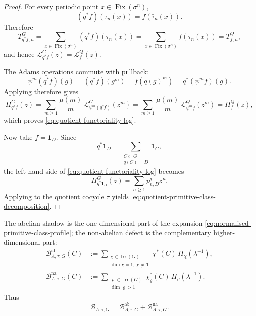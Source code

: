 \documentclass[11pt,a4paper]{amsart}
\theoremstyle{plain}
\theoremstyle{definition}
\theoremstyle{remark}
\DeclareMathOperator{\Irr}{Irr}
\begin{document}
\begin{proof}
  For every periodic point \(x\in\operatorname{Fix}(\sigma^n)\),
  \[
    (q^\ast f)(\tau_n(x))=f(\bar\tau_n(x)).
  \]
  Therefore
  \[
    T^{G}_{q^\ast f,n}
    =
    \sum_{x\in\operatorname{Fix}(\sigma^n)}(q^\ast f)(\tau_n(x))
    =
    \sum_{x\in\operatorname{Fix}(\sigma^n)}f(\bar\tau_n(x))
    =T^{Q}_{f,n},
  \]
  and hence \(\mathcal L_{q^\ast f}^{G}(z)=\mathcal L_f^{Q}(z)\).

  The Adams operations commute with pullback:
  \[
    \psi^m(q^\ast f)(g)
    =(q^\ast f)(g^m)
    =f(q(g)^m)
    =q^\ast(\psi^m f)(g).
  \]
  Applying  therefore gives
  \[
    \Pi_{q^\ast f}^{G}(z)
    =
    \sum_{m\ge 1}\frac{\mu(m)}{m}\,
      \mathcal L_{\psi^m(q^\ast f)}^{G}(z^m)
    =
    \sum_{m\ge 1}\frac{\mu(m)}{m}\,
      \mathcal L_{\psi^m f}^{Q}(z^m)
    =\Pi_f^{Q}(z),
  \]
  which proves \eqref{eq:quotient-functoriality-log}.

  Now take \(f=\mathbf 1_D\). Since
  \[
    q^\ast\mathbf 1_D=\sum_{\substack{C\subset G\\ q(C)=D}}\mathbf 1_C,
  \]
  the left-hand side of \eqref{eq:quotient-functoriality-log} becomes
  \[
    \Pi_{q^\ast\mathbf 1_D}^{G}(z)
    =
    \sum_{n\ge 1}p^q_{n,D}z^n.
  \]
  Applying  to the quotient
  cocycle \(\bar\tau\) yields
  \eqref{eq:quotient-primitive-class-decomposition}.
\end{proof}

\noindent
The abelian shadow is the one-dimensional part of the expansion
\eqref{eq:normalised-primitive-class-profile}; the non-abelian defect is
the complementary higher-dimensional part:
\begin{equation}\label{eq:abelian-shadow-defect}
  \begin{aligned}
    \mathcal B_{A,\tau;G}^{\mathrm{ab}}(C)
    &:=
    \sum_{\substack{\chi\in\Irr(G)\\ \dim\chi=1,\ \chi\neq \mathbf 1}}
      \chi^\ast(C)\,\Pi_\chi(\lambda^{-1}), \\
    \mathcal B_{A,\tau;G}^{\mathrm{na}}(C)
    &:=
    \sum_{\substack{\varrho\in\Irr(G)\\ \dim\varrho>1}}
      \chi_\varrho^\ast(C)\,\Pi_\varrho(\lambda^{-1}).
  \end{aligned}
\end{equation}
Thus
\begin{equation}\label{eq:abelian-shadow-defect-sum}
  \mathcal B_{A,\tau;G}=\mathcal B_{A,\tau;G}^{\mathrm{ab}}+\mathcal B_{A,\tau;G}^{\mathrm{na}}.
\end{equation}
\end{document}
